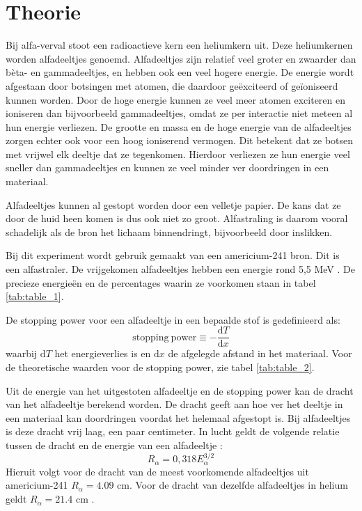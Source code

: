 \documentclass[11pt,a4paper]{article}
\begin{document}
\section{Theorie}
Bij alfa-verval stoot een radioactieve kern een heliumkern uit. Deze heliumkernen worden alfadeeltjes genoemd. Alfadeeltjes zijn relatief veel groter en zwaarder dan bèta- en gammadeeltjes, en hebben ook een veel hogere energie. De energie wordt afgestaan door botsingen met atomen, die daardoor geëxciteerd of geïoniseerd kunnen worden. Door de hoge energie kunnen ze veel meer atomen exciteren en ioniseren dan bijvoorbeeld gammadeeltjes, omdat ze per interactie niet meteen al hun energie verliezen. De grootte en massa en de hoge energie van de alfadeeltjes zorgen echter ook voor een hoog ioniserend vermogen. Dit betekent dat ze botsen met vrijwel elk deeltje dat ze tegenkomen. Hierdoor verliezen ze hun energie veel sneller dan gammadeeltjes en kunnen ze veel minder ver doordringen in een materiaal.\par
Alfadeeltjes kunnen al gestopt worden door een velletje papier. De kans dat ze door de huid heen komen is dus ook niet zo groot. Alfastraling is daarom vooral schadelijk als de bron het lichaam binnendringt, bijvoorbeeld door inslikken.\par
Bij dit experiment wordt gebruik gemaakt van een americium-241 bron. Dit is een alfastraler. De vrijgekomen alfadeeltjes hebben een energie rond 5,5 MeV \cite{Americium241}. De precieze energieën en de percentages waarin ze voorkomen staan in tabel \ref{tab:table_1}. \par
De stopping power voor een alfadeeltje in een bepaalde stof is gedefinieerd als:
\begin{equation}
\mathrm{stopping \ power} \equiv -\frac{\mathrm{d}T}{\mathrm{d}x}
\label{eq:stopping_power}
\end{equation}
waarbij $\mathrm{d}T$ het energieverlies is en $\mathrm{d}x$ de afgelegde afstand in het materiaal. Voor de theoretische waarden voor de stopping power, zie tabel \ref{tab:table_2}.\par
Uit de energie van het uitgestoten alfadeeltje en de stopping power kan de dracht van het alfadeeltje berekend worden. De dracht geeft aan hoe ver het deeltje in een materiaal kan doordringen voordat het helemaal afgestopt is. Bij alfadeeltjes is deze dracht vrij laag, een paar centimeter. In lucht geldt de volgende relatie tussen de dracht en de energie van een alfadeeltje \cite{RangeAir}:
\begin{equation}
R_\alpha = 0,318 E_\alpha ^{3/2}
\label{eq:Range_air}
\end{equation}
Hieruit volgt voor de dracht van de meest voorkomende alfadeeltjes uit americium-241 $R_\alpha = 4.09 $ cm. Voor de dracht van dezelfde alfadeeltjes in helium geldt $R_\alpha = 21.4 $ cm \cite{StoppingPowerHelium}.
\end{document}
